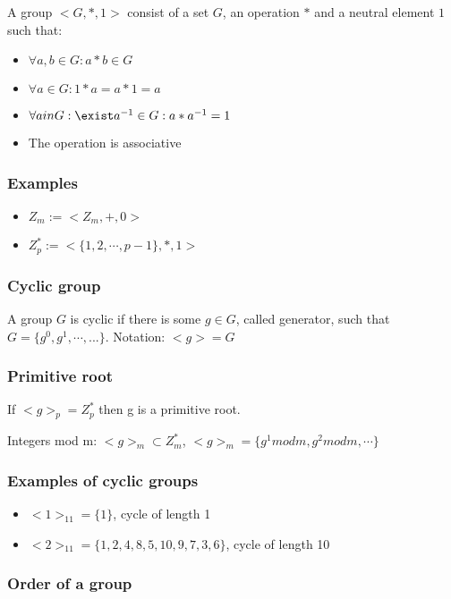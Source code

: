 \documentclass[a4paper]{scrreprt}
\begin{document}
A group $<G, *, 1>$ consist of a set $G$, an operation $*$ and a neutral element $1$ such that:
\begin{itemize}
	\item $\forall a, b \in G: a * b \in G$
	\item $\forall a \in G: 1 * a = a * 1 = a$
	\item $\forall a in G: \exist a^{-1} \in G: a * a^{-1} = 1$
	\item The operation is associative
\end{itemize}

\subsubsection{Examples}

\begin{itemize}
	\item $Z_m := <Z_m, +, 0>$
	\item $Z^{*}_p := <\{1, 2, \cdots, p - 1\}, *, 1>$
\end{itemize}

\subsubsection{Cyclic group}

A group $G$ is cyclic if there is some $g \in G$, called generator, such that
$G = \{g^0, g^1, \cdots, ...\}$. Notation: $<g> = G$

\subsubsection{Primitive root}

If $<g>_p = Z^{*}_p$ then g is a primitive root.

Integers mod m: $<g>_m \subset Z^{*}_m$, $<g>_m = \{g^1 mod m, g^2 mod m, \cdots\}$

\subsubsection{Examples of cyclic groups}

\begin{itemize}
	\item $<1>_{11} = \{1\}$, cycle of length 1
	\item $<2>_{11} = \{1, 2, 4, 8, 5, 10, 9, 7, 3, 6\}$, cycle of length 10
\end{itemize}

\subsubsection{Order of a group}
\end{document}
